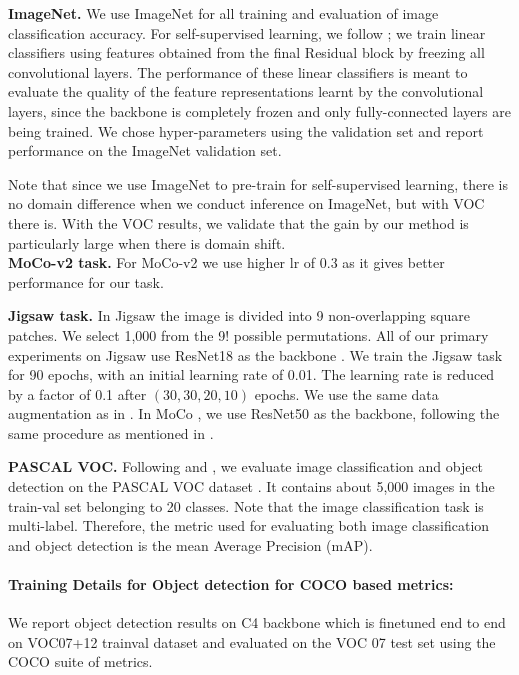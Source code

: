 \documentclass{bmvc2k}
\begin{document}
\noindent\textbf{ImageNet.} 
We use ImageNet for all training and evaluation of image classification accuracy. For self-supervised learning, we follow \cite{Caron2018DeepCF,he2019momentum}; we train linear classifiers using features obtained from the final Residual block by freezing all convolutional layers. 
The performance of these linear classifiers is meant to evaluate the quality of the feature
representations learnt by the convolutional layers, since the backbone is completely frozen and only
fully-connected layers are being trained. 
We chose hyper-parameters using the validation set and report performance on the ImageNet validation set.

Note that since we use ImageNet to pre-train for self-supervised learning, there is no domain difference when we conduct inference on ImageNet, but with VOC there is.  
With the VOC results, we validate that the gain by our method is particularly large when there is domain shift.\\
\noindent\textbf{MoCo-v2 task.} For MoCo-v2 we use  higher lr of 0.3 as it gives better performance for our task.

\noindent\textbf{Jigsaw task.} 
In Jigsaw \cite{Noroozi2016UnsupervisedLO} the image is divided into 9 non-overlapping square patches. We select 1,000 from the 9! possible permutations. All of our primary experiments on Jigsaw use ResNet18 as the backbone \cite{He2015}. We train the Jigsaw task for 90 epochs, with an initial learning rate of 0.01. The learning rate is reduced by a factor of 0.1 after $(30,30,20,10)$ epochs. We use the same data augmentation as in \cite{Noroozi2016UnsupervisedLO}. In MoCo \cite{He2015}, we use ResNet50\cite{He2015} as the backbone, following the same procedure as mentioned in \cite{he2019momentum}.



\noindent\textbf{PASCAL VOC.} 
Following \cite{Caron2018DeepCF} and \cite{chen2020improved}, we evaluate image classification and object detection on the PASCAL VOC dataset \cite{Everingham2009ThePV}. 
It contains about 5,000 images in the train-val set belonging to 20 classes. 
Note that the image classification task is multi-label. Therefore, the metric used for evaluating both image classification and object detection is the mean Average Precision (mAP). \paragraph{Training Details for Object detection for COCO based metrics:}
We report object detection results on \cite{Ren2015FasterRT} C4 backbone which is finetuned end to end on VOC07+12 trainval dataset and evaluated on the VOC 07
test set using the COCO suite of metrics. 
\end{document}
